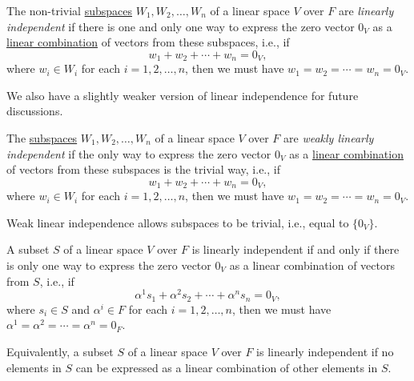 \begin{definition}\label{def:linear_independence}
  The non-trivial \hyperref[def:linear_subspace]{subspaces} $W_1, W_2, \ldots, W_n$ of a linear space $V$ over $F$ are \emph{linearly independent} if there is one and only one way to express the zero vector $0_V$ as a \hyperref[def:linear_combination]{linear combination} of vectors from these subspaces, i.e., if
  \[
    w_1 + w_2 + \cdots + w_n = 0_V,
  \]
  where $w_i \in W_i$ for each $i = 1, 2, \ldots, n$, then we must have $w_1 = w_2 = \cdots = w_n = 0_V$.
\end{definition}

We also have a slightly weaker version of linear independence for future discussions.

\begin{definition}\label{def:weakly_linear_independence}
  The \hyperref[def:linear_subspace]{subspaces} $W_1, W_2, \ldots, W_n$ of a linear space $V$ over $F$ are \emph{weakly linearly independent} if the only way to express the zero vector $0_V$ as a \hyperref[def:linear_combination]{linear combination} of vectors from these subspaces is the trivial way, i.e., if
  \[
    w_1 + w_2 + \cdots + w_n = 0_V,
  \]
  where $w_i \in W_i$ for each $i = 1, 2, \ldots, n$, then we must have $w_1 = w_2 = \cdots = w_n = 0_V$.
\end{definition}

\begin{remark}
  Weak linear independence allows subspaces to be trivial, i.e., equal to $\{ 0_V \}$.
\end{remark}

\begin{definition}\label{def:linear_independent_set}
  A subset $S$ of a linear space $V$ over $F$ is linearly independent if and only if there is only one way to express the zero vector $0_V$ as a linear combination of vectors from $S$, i.e., if
  \[
    \alpha^1 s_1 + \alpha^2 s_2 + \cdots + \alpha^n s_n = 0_V,
  \]
  where $s_i \in S$ and $\alpha^i \in F$ for each $i = 1, 2, \ldots, n$, then we must have $\alpha^1 = \alpha^2 = \cdots = \alpha^n = 0_F$.
\end{definition}

\begin{remark}
  Equivalently, a subset $S$ of a linear space $V$ over $F$ is linearly independent if no elements in $S$ can be expressed as a linear combination of other elements in $S$.
\end{remark}

